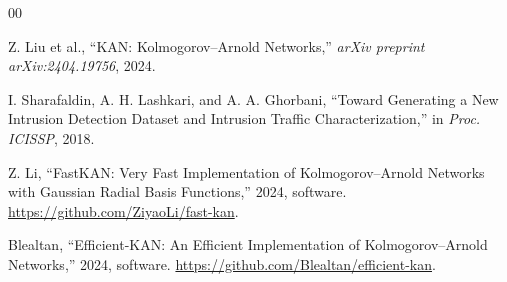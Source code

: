 \documentclass[conference]{IEEEtran}
\begin{document}
\begin{thebibliography}{00}

Z. Liu et al., ``KAN: Kolmogorov--Arnold Networks,''
\emph{arXiv preprint arXiv:2404.19756}, 2024.

I. Sharafaldin, A. H. Lashkari, and A. A. Ghorbani,
``Toward Generating a New Intrusion Detection Dataset and Intrusion Traffic
Characterization,'' in \emph{Proc. ICISSP}, 2018.

Z. Li, ``FastKAN: Very Fast Implementation of Kolmogorov--Arnold Networks
with Gaussian Radial Basis Functions,'' 2024, software.
\url{https://github.com/ZiyaoLi/fast-kan}.

Blealtan, ``Efficient-KAN: An Efficient Implementation of Kolmogorov--Arnold
Networks,'' 2024, software.
\url{https://github.com/Blealtan/efficient-kan}.

\end{thebibliography}
\end{document}
